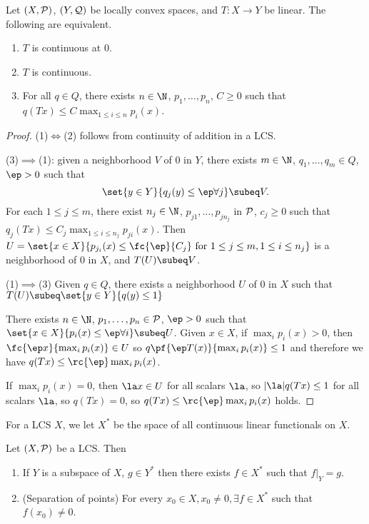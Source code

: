 \begin{lem}
Let $(X,\cal P)$, $(Y,\cal Q)$ be locally convex spaces, and $T:X\to Y$ be linear. The following are equivalent.
\begin{enumerate}
\item
$T$ is continuous at 0.
\item
$T$ is continuous.
\item
For all $q\in Q$, there exists $n\in \N$, $p_1,\ldots, p_n$, $C\ge 0$ such that $q(Tx)\le C\max_{1\le i\le n} p_i(x)$. 
\end{enumerate}
\end{lem}
\begin{proof}
(1)$\iff$(2) follows from continuity of addition in a LCS.

(3)$\implies$(1): given a neighborhood $V$ of 0 in $Y$, there exists $m\in \N$, $q_1,\ldots, q_m\in Q$, $\ep>0$ such that 
\[
\set{y\in Y}{q_j(y)\le \ep\forall j}\subeq V.
\]
For each $1\le j\le m$, there exist $n_j\in \N$, $p_{j1},\ldots, p_{jn_j}$ in $\cal P$, $c_j\ge 0$ such that $q_j(Tx)\le C_j\max_{1\le i\le n_j}p_{ji}(x)$. 
Then $U=\set{x\in X}{p_{j_i}(x)\le \fc{\ep}{C_j}\text{ for }1\le j\le m,1\le i\le n_j}$ is a neighborhood of 0 in $X$, and $T(U)\subeq V$. 

(1)$\implies$(3) Given $q\in Q$, there exists a neighborhood $U$ of 0 in $X$ such that $T(U)\subeq \set{y\in Y}{q(y)\le 1}$  

There exists $n \in \N$, $p_1,\ldots, p_n\in \cal P$, $\ep>0$ such that $\set{x\in X}{p_i(x)\le \ep\forall i}\subeq U$.
Given $x\in X$, if $\max_ip_i(x)>0$, then $\fc{\ep x}{\max_i p_i(x)}\in U$ so $q\pf{\ep T(x)}{\max_i p_i(x)}\le 1$ and therefore we have $q(Tx)\le \rc{\ep}\max_i p_i(x)$. 

If $\max_i p_i(x)=0$, then $\la x\in U$ for all scalars $\la$, so $|\la|q(Tx)\le 1$ for all scalars $\la$, so $q(Tx)=0$, so $q(Tx)\le \rc{\ep}\max_ip_i(x)$ holds.
\end{proof}
\begin{df}
For a LCS $X$, we let $X^*$ be the space of all continuous linear functionals on $X$.
\end{df}
\begin{thm}  Let $(X,\cal P)$ be a LCS. Then 
\begin{enumerate}
\item
If $Y$ is a subspace of $X$, $g\in Y^*$ then there exists $f\in X^*$ such that $f|_Y=g$.
\item (Separation of points) For every $x_0\in X,x_0\ne 0, \exists f\in X^*$ such that $f(x_0)\ne 0$.
\end{enumerate}
\end{thm}
